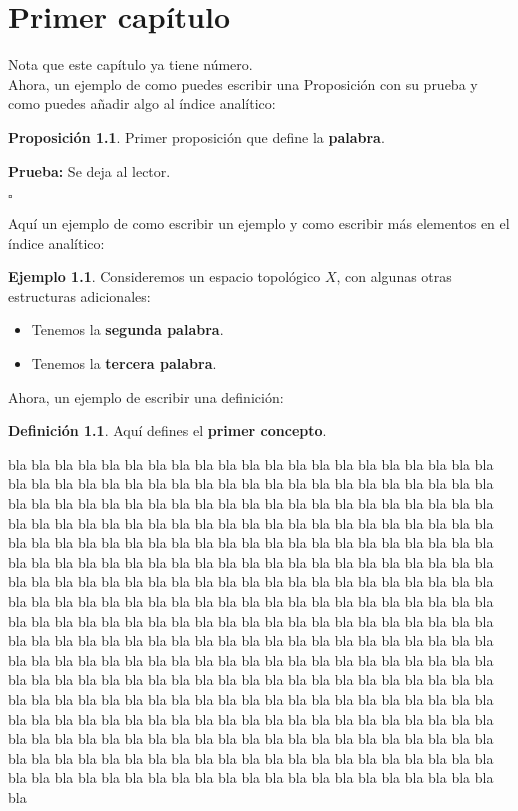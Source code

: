 \documentclass[12pt]{book}%
\theoremstyle{definition}%
\newtheorem{df}{Definición}[chapter]
\newtheorem{ej}{Ejemplo}[chapter]
\newtheorem{prop}{Proposición}[chapter]
\newenvironment{pba}{\noindent\textbf{Prueba:}}{\begin{flushright} $\square$ \end{flushright}}
\begin{document}
\chapter{Primer capítulo}

Nota que este capítulo ya tiene número. \\

Ahora, un ejemplo de como puedes escribir una Proposición con su prueba y como puedes añadir algo al índice analítico:


\begin{prop}
Primer proposición que define la \textbf{palabra}.
\end{prop}
\begin{pba}
Se deja al lector.
\end{pba}

Aquí un ejemplo de como escribir un ejemplo y como escribir más elementos en el índice analítico:

\begin{ej}
Consideremos un espacio topológico $X$, con algunas otras estructuras adicionales: 
\begin{itemize}
\item Tenemos la \textbf{segunda palabra}.

\item Tenemos la \textbf{tercera palabra}.
\end{itemize}
\end{ej}

Ahora, un ejemplo de escribir una definición:

\begin{df}
Aquí defines el \textbf{primer concepto}.
\end{df}

bla bla bla bla bla bla bla bla bla bla bla bla bla bla bla bla bla bla bla bla bla bla bla bla bla bla bla bla bla bla bla bla bla bla bla bla bla bla bla bla bla bla bla bla bla bla bla bla bla bla bla bla bla bla bla bla bla bla bla bla bla bla bla bla bla bla bla bla bla bla bla bla bla bla bla bla bla bla bla bla bla bla bla bla bla bla bla bla bla bla bla bla bla bla bla bla bla bla bla bla bla bla bla bla bla bla bla bla bla bla bla bla bla bla bla bla bla bla bla bla bla bla bla bla bla bla bla bla bla bla bla bla bla bla bla bla bla bla bla bla bla bla bla bla bla bla bla bla bla bla bla bla bla bla bla bla bla bla bla bla bla bla bla bla bla bla bla bla bla bla bla bla bla bla bla bla bla bla bla bla bla bla bla bla bla bla bla bla bla bla bla bla bla bla bla bla bla bla bla bla bla bla bla bla bla bla bla bla bla bla bla bla bla bla bla bla bla bla bla bla bla bla bla bla bla bla bla bla bla bla bla bla bla bla bla bla bla bla bla bla bla bla bla bla bla bla bla bla bla bla bla bla bla bla bla bla bla bla bla bla bla bla bla bla bla bla bla bla bla bla bla bla bla bla bla bla bla bla bla bla bla bla bla bla bla bla bla bla bla bla bla bla bla bla bla bla bla bla bla bla bla bla bla bla bla bla bla bla bla bla bla bla bla bla bla bla bla bla bla bla bla bla bla bla bla bla bla bla bla bla bla bla bla bla bla bla bla bla bla bla bla bla bla bla bla bla bla bla bla bla bla bla bla bla bla bla bla bla 
\end{document}
